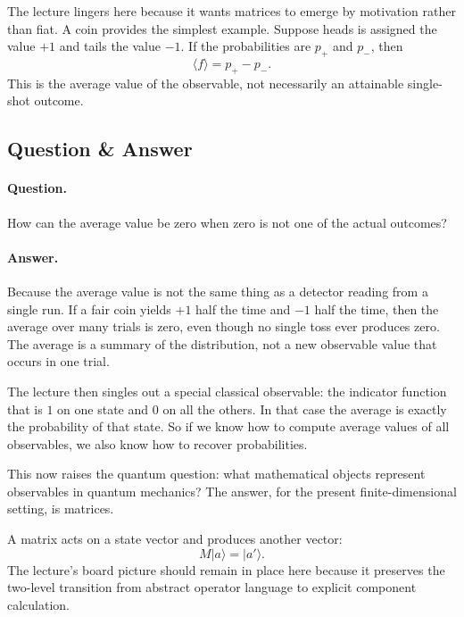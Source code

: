 The lecture lingers here because it wants matrices to emerge by motivation rather than fiat. A coin provides the simplest example. Suppose heads is assigned the value \(+1\) and tails the value \(-1\). If the probabilities are \(p_+\) and \(p_-\), then
\begin{equation}
\langle f\rangle=p_+-p_-.
\end{equation}
This is the average value of the observable, not necessarily an attainable single-shot outcome.

\subsection{Question \& Answer}

\paragraph{Question.} How can the average value be zero when zero is not one of the actual outcomes?

\paragraph{Answer.} Because the average value is not the same thing as a detector reading from a single run. If a fair coin yields \(+1\) half the time and \(-1\) half the time, then the average over many trials is zero, even though no single toss ever produces zero. The average is a summary of the distribution, not a new observable value that occurs in one trial.

The lecture then singles out a special classical observable: the indicator function that is \(1\) on one state and \(0\) on all the others. In that case the average is exactly the probability of that state. So if we know how to compute average values of all observables, we also know how to recover probabilities.

This now raises the quantum question: what mathematical objects represent observables in quantum mechanics? The answer, for the present finite-dimensional setting, is matrices.

A matrix acts on a state vector and produces another vector:
\begin{equation}
M|a\rangle=|a'\rangle.
\end{equation}
The lecture's board picture should remain in place here because it preserves the two-level transition from abstract operator language to explicit component calculation.

